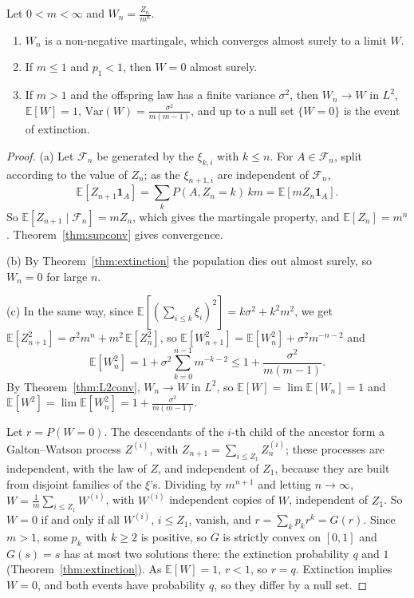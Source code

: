 \begin{theorem}\label{thm:gwlimit}
Let $0<m<\infty$ and $W_n=\frac{Z_n}{m^n}$.
\begin{enumerate}[label=(\alph*)]
\item $W_n$ is a non-negative martingale, which converges almost surely to a limit $W$.
\item If $m\le1$ and $p_1<1$, then $W=0$ almost surely.
\item If $m>1$ and the offspring law has a finite variance $\sigma^2$, then $W_n\to W$ in $L^2$, $\mathbb E[W]=1$, $\mathrm{Var}(W)=\frac{\sigma^2}{m(m-1)}$, and up to a null set
$\{W=0\}$ is the event of extinction.
\end{enumerate}
\end{theorem}
\begin{proof}
(a) Let $\mathcal F_n$ be generated by the $\xi_{k,i}$ with $k\le n$. For $A\in\mathcal F_n$, split according to the value of $Z_n$; as the $\xi_{n+1,i}$ are independent of
$\mathcal F_n$,
\[
\mathbb E[Z_{n+1}\mathbf 1_A]=\sum_kP(A,Z_n=k)\,km=\mathbb E[mZ_n\mathbf 1_A].
\]
So $\mathbb E[Z_{n+1}\mid\mathcal F_n]=mZ_n$, which gives the martingale property, and $\mathbb E[Z_n]=m^n$. Theorem~\ref{thm:supconv} gives convergence.

(b) By Theorem~\ref{thm:extinction} the population dies out almost surely, so $W_n=0$ for large $n$.

(c) In the same way, since $\mathbb E[(\sum_{i\le k}\xi_i)^2]=k\sigma^2+k^2m^2$, we get $\mathbb E[Z_{n+1}^2]=\sigma^2m^n+m^2\,\mathbb E[Z_n^2]$, so
$\mathbb E[W_{n+1}^2]=\mathbb E[W_n^2]+\sigma^2m^{-n-2}$ and
\[
\mathbb E[W_n^2]=1+\sigma^2\sum_{k=0}^{n-1}m^{-k-2}\le1+\frac{\sigma^2}{m(m-1)}.
\]
By Theorem~\ref{thm:L2conv}, $W_n\to W$ in $L^2$, so $\mathbb E[W]=\lim\mathbb E[W_n]=1$ and $\mathbb E[W^2]=\lim\mathbb E[W_n^2]=1+\frac{\sigma^2}{m(m-1)}$.

Let $r=P(W=0)$. The descendants of the $i$-th child of the ancestor form a Galton--Watson process $Z^{(i)}$, with
$Z_{n+1}=\sum_{i\le Z_1}Z^{(i)}_n$; these processes are independent, with the law of $Z$, and independent of $Z_1$, because they are built
from disjoint families of the $\xi$'s. Dividing by $m^{n+1}$ and letting $n\to\infty$, $W=\frac1m\sum_{i\le Z_1}W^{(i)}$, with $W^{(i)}$ independent copies of $W$,
independent of $Z_1$. So $W=0$ if and only if all $W^{(i)}$, $i\le Z_1$, vanish, and $r=\sum_kp_kr^k=G(r)$. Since $m>1$, some $p_k$ with $k\ge2$ is positive, so
$G$ is strictly convex on $[0,1]$ and $G(s)=s$ has at most two solutions there: the extinction probability $q$ and $1$ (Theorem~\ref{thm:extinction}). As
$\mathbb E[W]=1$, $r<1$, so $r=q$. Extinction implies $W=0$, and both events have probability $q$, so they differ by a null set.
\end{proof}

